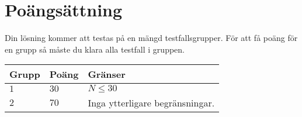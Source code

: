 \section*{Poängsättning}
Din lösning kommer att testas på en mängd testfallsgrupper.
För att få poäng för en grupp så måste du klara alla testfall i gruppen.

\noindent
\begin{tabular}{| l | l | p{12cm} |}
  \hline
  \textbf{Grupp} & \textbf{Poäng} & \textbf{Gränser} \\ \hline
  $1$    & $30$       & $N \leq 30$ \\ \hline
  $2$    & $70$       & Inga ytterligare begränsningar. \\ \hline
\end{tabular}
